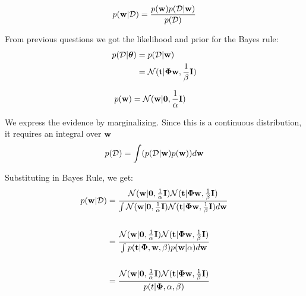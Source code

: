 \documentclass[12pt,a4paper]{article}
\newcommand{\Data}{\mathcal{D}}
\newcommand{\eye}{{\bf I}}
\newcommand{\tscalar}{t}
\newcommand{\tvec}{{\bf \tscalar}}
\newcommand{\wscalar}{w}
\newcommand{\wvec}{{\bf \wscalar}}
\newcommand{\zerovec}{ {\bf 0}}
\newcommand{\thetavec}{\boldsymbol{\theta}}
\newcommand{\thetav}{\thetavec}
\newcommand{\Phimat}{\boldsymbol{\Phi}}
\begin{document}
\begin{enumerate}
		  \begin{align*}
		  p(\wvec | \mathcal{D}) &= \frac{p(\wvec) p(\mathcal{D} | \wvec) }{p(\Data)} \\
		  \end{align*}
		  
		  From previous questions we got the likelihood and prior for the Bayes rule: \\
		  
		  \begin{align*}
		  p(\Data | \thetav) &= p(\Data | \wvec) \\
		  &= \mathcal{N}(\tvec | \Phimat \wvec, \frac{1}{\beta} \eye )
		  \end{align*}
		  
		  \begin{align*}
		  p(\wvec) &= \mathcal{N}(\wvec | \zerovec, \frac{1}{\alpha}\eye)
		  \end{align*}
		  
		  We express the evidence by marginalizing. Since this is a continuous distribution, it requires an integral over $\wvec$ \\
		  
		  \begin{align*}
		  p(\Data) &= \int (p(\mathcal{D} | \wvec) p(\wvec) ) d\wvec\\
		  \end{align*}
		  
		  Substituting in Bayes Rule, we get: \\
		  
		  \begin{align*}
		  p(\wvec | \Data) &= \frac{\mathcal{N}(\wvec | \zerovec, \frac{1}{\alpha} \eye) \mathcal{N} (\tvec | \Phimat \wvec, \frac{1}{\beta} \eye)}{\int {\mathcal{N}(\wvec | \zerovec, \frac{1}{\alpha} \eye) \mathcal{N} (\tvec | \Phimat \wvec, \frac{1}{\beta} \eye) d\wvec}} \\ \\
		  &= \frac{\mathcal{N}(\wvec | \zerovec, \frac{1}{\alpha} \eye) \mathcal{N} (\tvec | \Phimat \wvec, \frac{1}{\beta} \eye)}{\int p(\tvec | \Phimat, \wvec, \beta) p(\wvec | \alpha)d\wvec} \\ \\
		  &= \frac{\mathcal{N}(\wvec | \zerovec, \frac{1}{\alpha} \eye) \mathcal{N} (\tvec | \Phimat \wvec, \frac{1}{\beta} \eye)}{p(t | \Phimat, \alpha, \beta)}
		  \end{align*}
  

\end{enumerate}
\end{document}
